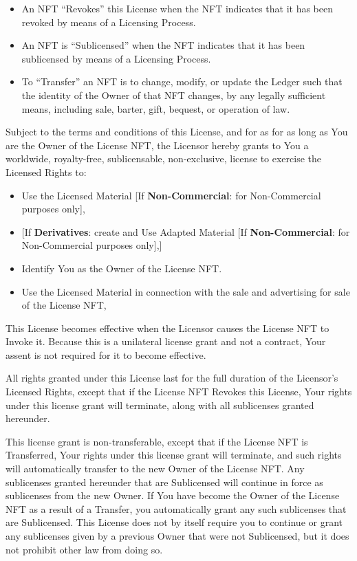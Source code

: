\documentclass{article}
\newcommand{\keyword}[1]{\textbf{#1}\xspace}
\newcommand{\noncommercial}{\keyword{Non-Commercial}}
\newcommand{\derivative}{\keyword{Derivatives}}
\newcommand{\sect}[1]{\vspace{12pt}\noindent{\strong{#1}}}
\begin{document}
\begin{sffamily}
\begin{itemize}
	\item	An NFT ``Revokes'' this License when the NFT indicates that it has been revoked by means of a Licensing Process.

	\item	An NFT is ``Sublicensed'' when the NFT indicates that it has been sublicensed by means of a Licensing Process.

	\item	To ``Transfer'' an NFT is to change, modify, or update the Ledger such that the identity of the Owner of that NFT changes, by any legally sufficient means, including sale, barter, gift, bequest, or operation of law. 
	
	\end{itemize}



\sect{License Grant}

Subject to the terms and conditions of this License, and for as for as long as You are the Owner of the License NFT, the Licensor hereby grants to You a worldwide, royalty-free, sublicensable, non-exclusive, license to exercise the Licensed Rights to:
\begin{itemize}
\item Use the Licensed Material [If \noncommercial: for Non-Commercial purposes only],
\item {[}If \derivative: create and Use Adapted Material [If \noncommercial: for Non-Commercial purposes only],]
\item Identify You as the Owner of the License NFT.
\item Use the Licensed Material in connection with the sale and advertising for sale of the License NFT,
\end{itemize}
This License becomes effective when the Licensor causes the License NFT to Invoke it. Because this is a unilateral license grant and not a contract, Your assent is not required for it to become effective.

All rights granted under this License last for the full duration of the Licensor's Licensed Rights, except that if the License NFT Revokes this License, Your rights under this license grant will terminate, along with all sublicenses granted hereunder. 

This license grant is non-transferable, except that if the License NFT is Transferred, Your rights under this license grant will terminate, and such rights will automatically transfer to the new Owner of the License NFT. Any sublicenses granted hereunder that are Sublicensed will continue in force as sublicenses from the new Owner. If You have become the Owner of the License NFT as a result of a Transfer, you automatically grant any such sublicenses that are Sublicensed. This License does not by itself require you to continue or grant any sublicenses given by a previous Owner that were not Sublicensed, but it does not prohibit other law from doing so.





\end{sffamily}
\end{document}
